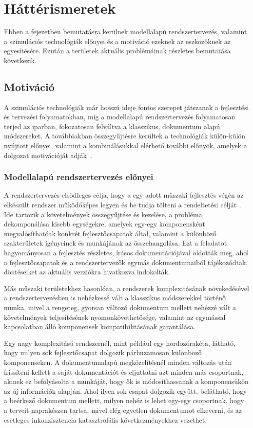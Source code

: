 \chapter{Háttérismeretek}
Ebben a fejezetben bemutatásra kerülnek modellalapú rendszertervezés, valamint a szimulációs technológiák előnyei és a motiváció ezeknek az eszközöknek az egyesítésére.
Ezután a területek aktuális problémáinak részletes bemutatása következik.

\section{Motiváció}
    A szimulációs technológiák már hosszú ideje fontos szerepet játszanak a fejlesztési és tervezési folyamatokban, míg a modellalapú rendszertervezés folyamatosan terjed az iparban, fokozatosan felváltva a klasszikus, dokumentum alapú módszereket.
    A továbbiakban összegyűjtésre kerültek a technológiák külön-külön nyújtott előnyei, valamint a kombinálásukkal elérhető további előnyök, amelyek a dolgozat motivációját adják~\cite{Madni_2018, Bajaj_2022}.
    
    \subsection{Modellalapú rendszertervezés előnyei}
        A rendszertervezés elsődleges célja, hogy a egy adott műszaki fejlesztés végén az elkészült rendszer működőképes legyen és be tudja tölteni a rendeltetési célját~\cite{Bajaj_2022, Gianni2017}.
        Ide tartozik a követelmények összegyűjtése és kezelése, a probléma dekomponálása kisebb egységekre, amelyek egy-egy komponensként megvalósíthatóak konkrét fejlesztőcsapatok által, valamint a különböző szakterületek igényeinek és munkájának az összehangolása.
        Ezt a feladatot hagyományosan a fejlesztés részletes, írásos dokumentációjával oldották meg, ahol a fejlesztőcsapatok és a rendszertervezők egymás dokumentumaiból tájékozódtak, döntéseiket az aktuális verziókra hivatkozva indokolták.

        Más műszaki területekhez hasonlóan, a rendszerek komplexitásának növekedésével a rendszertervezésben is nehézkessé vált a klasszikus módszerekkel történő munka, mivel a rengeteg, gyorsan változó dokumentum mellett nehézzé vált a követelmények teljesítésének nyomonkövethetősége, valamint az egymással kapcsolatban álló komponensek kompatibilitásának garantálása.
        
        Egy nagy komplexitású rendszernél, mint például egy hordozórakéta, látható, hogy milyen sok fejlesztőcsapat dolgozik párhuzamosan különböző komponenseken. A dokumentumalapú megközelítésnél minden változás után frissíteni kellett a saját dokumentációt és eljuttatni azt minden más csoportnak, akinek ez befolyásolta a munkáját, hogy ők is módosíthassanak a komponensükön az új információk alapján.
        Ahol ilyen sok csapat dolgozik együtt, belátható, hogy a beérkező dokumentum mellett, milyen nehéz is lehet egy-egy csoportnak, hogy a terveit naprakészen tartsa, mivel elég egyetlen dokumentumot elkeverni, és az esetleges inkonzisztencia katasztrofális következményekhez vezethet.
        
